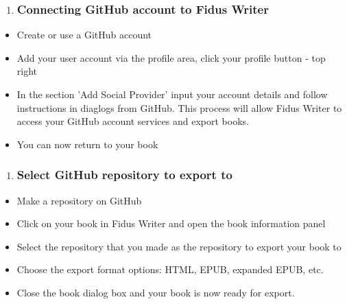 \documentclass{article}
\begin{document}
\begin{enumerate}
\item \subsubsection{Connecting GitHub account to Fidus Writer}\label{H5477297}



\end{enumerate}
\begin{itemize}
\item Create or use a GitHub account


\item Add your user account via the profile area, click your profile button - top right


\item In the section 'Add Social Provider' input your account details and follow instructions in diaglogs from GitHub. This process will allow Fidus Writer to access your GitHub account services and export books.


\item You can now return to your book


\end{itemize}
\begin{enumerate}[start=2]
\item \subsubsection{Select GitHub repository to export to}\label{H3699755}



\end{enumerate}
\begin{itemize}
\item Make a repository on GitHub


\item Click on your book in Fidus Writer and open the book information panel


\item Select the repository that you made as the repository to export your book to


\item Choose the export format options: HTML, EPUB, expanded EPUB, etc.


\item Close the book dialog box and your book is now ready for export. 


\end{itemize}
\end{document}
